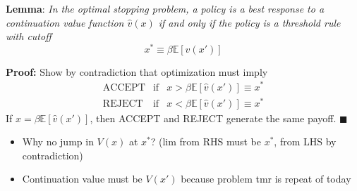 \documentclass[11pt, aspectratio=169]{beamer}
\begin{document}
\begin{frame}{}

\vspace{5mm}
\textbf{Lemma}: \textit{In the optimal stopping problem, a policy is a best response to a continuation value function $\widehat v(x)$ if and only if the policy is a threshold rule
with cutoff} 
\begin{equation*}
	x^* \equiv \beta \mathbb E[ \widehat v(x')]  
\end{equation*}

\vspace{5mm}
\textbf{Proof:} Show by contradiction that optimization must imply 
\begin{equation*}
\begin{array}{ccc}
	\text{ACCEPT} & \text{if} & x > \beta \mathbb E[ \widehat{v}(x')] \equiv x^* \\
	\text{REJECT} & \text{if} & x < \beta \mathbb E[ \widehat{v}(x')] \equiv x^*
\end{array}
\end{equation*}
If $x = \beta \mathbb E[\widehat v(x')]$, then ACCEPT and REJECT generate the same payoff. $\blacksquare $

\vspace{4mm}
\begin{itemize}
\item Why no jump in $V(x)$ at $x^*$? (lim from RHS must be $x^*$, from LHS by contradiction)

\item Continuation value must be $V(x')$ because problem tmr is repeat of today
\end{itemize}
\end{frame}
\end{document}
